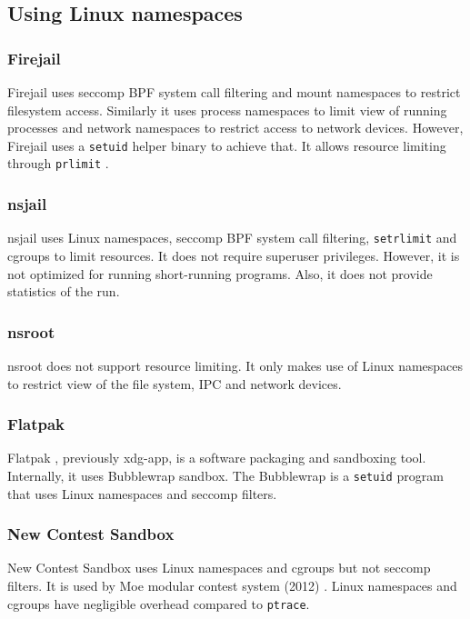 \documentclass[en]{pracamgr}
\begin{document}
\subsection{Using Linux namespaces}

\subsubsection{Firejail}
Firejail \cite{netblue30/firejail} uses seccomp BPF system call filtering and mount namespaces to restrict filesystem access. Similarly it uses process namespaces to limit view of running processes and network namespaces to restrict access to network devices. However, Firejail uses a \texttt{setuid} \cite{man_setuid} helper binary to achieve that. It allows resource limiting through \texttt{prlimit} \cite{man_getrlimit_setrlimit_prlimit}.

\subsubsection{nsjail} \label{subsubsection:nsjail}
nsjail \cite{google/nsjail} uses Linux namespaces, seccomp BPF system call filtering, \texttt{setrlimit} \cite{man_getrlimit_setrlimit_prlimit} and cgroups to limit resources. It does not require superuser privileges. However, it is not optimized for running short-running programs. Also, it does not provide statistics of the run.

\subsubsection{nsroot}
nsroot \cite{raknes2016nsroot} does not support resource limiting. It only makes use of Linux namespaces to restrict view of the file system, IPC and network devices.

\subsubsection{Flatpak}
Flatpak \cite{flatpak}, previously xdg-app, is a software packaging and sandboxing tool. Internally, it uses Bubblewrap sandbox. The Bubblewrap \cite{bubblewrap} is a \texttt{setuid} \cite{man_setuid} program that uses Linux namespaces and seccomp filters.

\subsubsection{New Contest Sandbox}
New Contest Sandbox \cite{marevs2012new} uses Linux namespaces and cgroups but not seccomp filters. It is used by Moe modular contest system (2012) \cite{marevs2012new}. Linux namespaces and cgroups have negligible overhead compared to \texttt{ptrace}.
\end{document}
